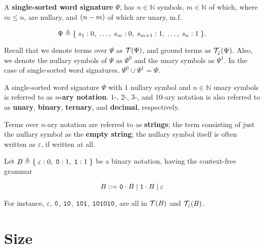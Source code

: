 \begin{definition} A \textbf{single-sorted word signature} $\Psi$,
has $n \in \mathbb{N}$ symbols, $m \in \mathbb{N}$ of which, where $m \leq n$,
are nullary, and ${\mathopen{}\left({n-m}\right)\mathclose{}}$ of which are unary, m.f.

$$\Psi \triangleq \mathopen{}\left\{\mathrel{}{s_1 : 0, \; \ldots, \; s_m : 0, \; s_{m+1} : 1, \;
\ldots, \; s_n : 1}\mathrel{}\right\}\mathclose{}.$$

\end{definition}

Recall that we denote terms over $\Psi$ as $\mathcal{T}{\mathopen{}\left({\Psi}\right)\mathclose{}}$, and ground
terms as $\mathcal{T}_\downarrow{\ensuremath{\mathopen{}\left({\Psi}\right)\mathclose{}}}$. Also, we denote the nullary symbols
of $\Psi$ as $\Psi^0$ and the unary symbols as $\Psi^1$. In the case of
single-sorted word signatures, $\Psi^0 \cup \Psi^1 = \Psi$.

\begin{definition} A single-sorted word signature $\Psi$ with $1$ nullary
symbol and $n \in \mathbb{N}$ unary symbols is referred to as \textbf{$n$-ary
notation}. $1$-, $2$-, $3$-, and $10$-ary notation is also referred to as
\textbf{unary}, \textbf{binary}, \textbf{ternary}, and \textbf{decimal},
respectively.  \end{definition}

\begin{definition} Terms over $n$-ary notation are referred to as
\textbf{strings}; the term consisting of just the nullary symbol as the
\textbf{empty string}; the nullary symbol itself is often written as
$\varepsilon$, if written at all. \end{definition} 

\begin{example} Let $B \triangleq \mathopen{}\left\{\mathrel{}{\varepsilon : 0, \; \mathtt{0} : 1, \;
\mathtt{1} : 1}\mathrel{}\right\}\mathclose{}$ be a binary notation, having the context-free grammar

$$B ::= \mathtt{0} \cdot B \mid \mathtt{1} \cdot B \mid \varepsilon$$

For instance, $\varepsilon$, $\mathtt{0}$, $\mathtt{1}\mathtt{0}$,
$\mathtt{1}\mathtt{0}\mathtt{1}$, $\mathtt{1}\mathtt{0}\mathtt{1}\mathtt{0}\mathtt{1}\mathtt{0}$,
are all in $\mathcal{T}{\mathopen{}\left({B}\right)\mathclose{}}$ and $\mathcal{T}_\downarrow{\ensuremath{\mathopen{}\left({B}\right)\mathclose{}}}$.

\end{example}

\section{Size}

\label{sec:size}

